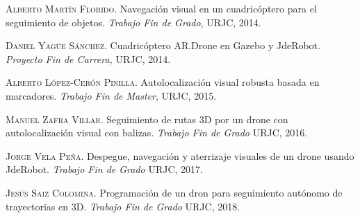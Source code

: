 \documentclass[a4paper, 12pt, oneside]{book}
\begin{document}
\pagestyle{fancy}
\setlength{\parindent}{6mm}

\lhead[]{}







\begin{thebibliography}{X}
 \textsc{Alberto Martín Florido.} Navegación visual en un cuadricóptero para el seguimiento de objetos. \textit{Trabajo Fin de Grado}, URJC, 2014.	

 \textsc{Daniel Yagüe Sánchez.} Cuadricóptero AR.Drone en Gazebo y JdeRobot. \textit{Proyecto Fin de Carrera,} URJC, 2014.

 \textsc{Alberto López-Cerón Pinilla.} Autolocalización visual robusta basada en marcadores. \textit{Trabajo Fin de Master}, URJC, 2015.

 \textsc{Manuel Zafra Villar.} Seguimiento de rutas 3D por un drone con autolocalización visual con balizas. \textit{Trabajo Fin de Grado} URJC, 2016.

 \textsc{Jorge Vela Peña.} Despegue, navegación y aterrizaje visuales de un drone usando JdeRobot. \textit{Trabajo Fin de Grado} URJC, 2017. 

 \textsc{Jesús Saiz Colomina.} Programación de un dron para seguimiento autónomo de trayectorias en 3D. \textit{Trabajo Fin de Grado} URJC, 2018.



\end{thebibliography} 
\end{document}
